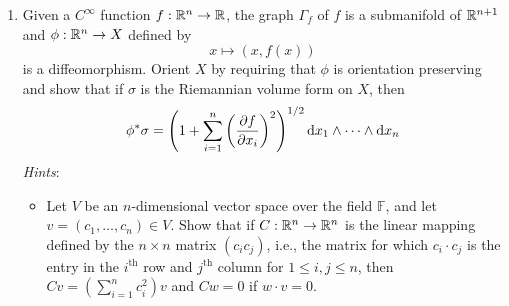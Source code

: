 \documentclass[../psets.tex]{subfiles}
\begin{document}
\begin{enumerate}[label={\textbf{4.4.\roman*.}}]
\begin{proof}
        \begin{align*}
            \phi^*\sigma &= (\det(\phi_{i,j}))^{1/2}\dd{x}\\
            &= \left( \det\left[ \sum_{k=1}^2\dv{\phi_k}{x}\dv{\phi_k}{x} \right] \right)^{1/2}\dd{x}\\
            &= \left( \det\left[ 1^2+\left( \dv{f}{x} \right)^2 \right] \right)^{1/2}\dd{x}\\
            &= \left( 1+\left( \dv{f}{x} \right)^2 \right)^{1/2}\dd{x}
        \end{align*}
        as desired.
    \end{proof}
    \item Given a $C^\infty$ function $f:\mathbb{R}^n\to\mathbb{R}$, the graph $\Gamma_f$ of $f$ is a submanifold of $\mathbb{R}^{n+1}$ and $\phi:\mathbb{R}^n\to X$ defined by
    \begin{equation*}
        x \mapsto (x,f(x))
    \end{equation*}
    is a diffeomorphism. Orient $X$ by requiring that $\phi$ is orientation preserving and show that if $\sigma$ is the Riemannian volume form on $X$, then
    \begin{equation*}
        \phi^*\sigma = \left( 1+\sum_{i=1}^n\left( \pdv{f}{x_i} \right)^2 \right)^{1/2}\dd{x_1}\wedge\cdots\wedge\dd{x_n}
    \end{equation*}
    \emph{Hints}:
    \begin{itemize}[label={\scriptsize$\blacktriangleright$}]
        \item Let $V$ be an $n$-dimensional vector space over the field $\mathbb{F}$, and let $v=(c_1,\dots,c_n)\in V$. Show that if $C:\mathbb{R}^n\to\mathbb{R}^n$ is the linear mapping defined by the $n\times n$ matrix $(c_ic_j)$, i.e., the matrix for which $c_i\cdot c_j$ is the entry in the $i^\text{th}$ row and $j^\text{th}$ column for $1\leq i,j\leq n$, then $Cv=(\sum_{i=1}^nc_i^2)v$ and $Cw=0$ if $w\cdot v=0$.

\end{itemize}
\end{enumerate}
\end{document}
